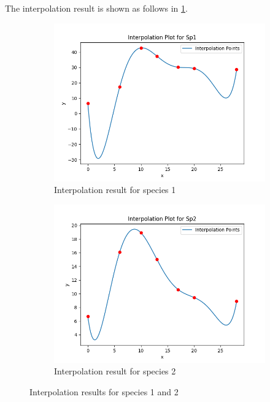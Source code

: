 \documentclass[a4paper]{article}
\begin{document}
The interpolation result is shown as follows in \cref{fig:E.result}.

\begin{figure}[htbp]
    \centering
    \begin{subfigure}[b]{0.45\textwidth}
        \includegraphics[width=\textwidth]{../results/Task_E/Interpolation_Plot_Sp1.png}
        \caption{Interpolation result for species 1}
    \end{subfigure}
    \hfill
    \begin{subfigure}[b]{0.45\textwidth}
        \includegraphics[width=\textwidth]{../results/Task_E/Interpolation_Plot_Sp2.png}
        \caption{Interpolation result for species 2}
    \end{subfigure}
    \caption{Interpolation results for species 1 and 2}
    \label{fig:E.result}
\end{figure}
\end{document}
